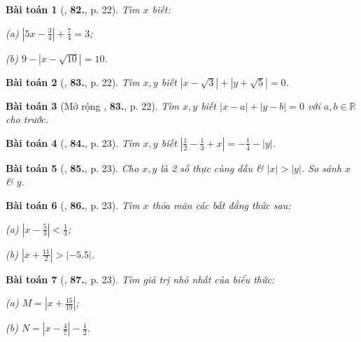 \documentclass{article}
\numberwithin{equation}{section}
\newtheorem{baitoan}{Bài toán}
\begin{document}
\begin{baitoan}[\cite{Tuyen_Toan_7}, \textbf{82.}, p. 22]
	Tìm $x$ biết:
	\begin{enumerate*}
		\item[(a)] $\left|5x - \frac{3}{4}\right| + \frac{7}{4} = 3$;
		\item[(b)] $9 - |x - \sqrt{10}| = 10$.
	\end{enumerate*}
\end{baitoan}

\begin{baitoan}[\cite{Tuyen_Toan_7}, \textbf{83.}, p. 22]
	Tìm $x,y$ biết $|x - \sqrt{3}| + |y + \sqrt{5}| = 0$.
\end{baitoan}

\begin{baitoan}[Mở rộng \cite{Tuyen_Toan_7}, \textbf{83.}, p. 22]
	Tìm $x,y$ biết $|x - a| + |y - b| = 0$ với $a,b\in\mathbb{R}$ cho trước.
\end{baitoan}

\begin{baitoan}[\cite{Tuyen_Toan_7}, \textbf{84.}, p. 23]
	Tìm $x,y$ biết $\left|\frac{1}{2} - \frac{1}{3} + x\right| = -\frac{1}{4} - |y|$.
\end{baitoan}

\begin{baitoan}[\cite{Tuyen_Toan_7}, \textbf{85.}, p. 23]
	Cho $x,y$ là 2 số thực cùng dấu \& $|x| > |y|$. So sánh $x$ \& $y$.
\end{baitoan}

\begin{baitoan}[\cite{Tuyen_Toan_7}, \textbf{86.}, p. 23]
	Tìm $x$ thỏa mãn các bất đẳng thức sau:
	\begin{enumerate*}
		\item[(a)] $\left|x - \frac{5}{3}\right| < \frac{1}{3}$;
		\item[(b)] $\left|x + \frac{11}{2}\right| > |-5.5|$.
	\end{enumerate*}
\end{baitoan}

\begin{baitoan}[\cite{Tuyen_Toan_7}, \textbf{87.}, p. 23]
	Tìm giá trị nhỏ nhất của biểu thức:
	\begin{enumerate*}
		\item[(a)] $M = \left|x + \frac{15}{19}\right|$;
		\item[(b)] $N = \left|x - \frac{4}{7}\right| - \frac{1}{2}$.
	\end{enumerate*}
\end{baitoan}
\end{document}
